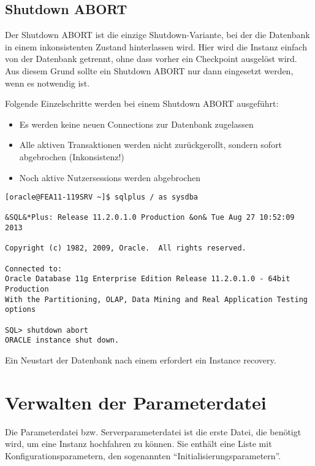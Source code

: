       \subsection{Shutdown ABORT}
        Der Shutdown ABORT ist die einzige Shutdown-Variante, bei der die
        Datenbank in einem inkonsistenten Zustand hinterlassen wird. Hier wird
        die Instanz einfach von der Datenbank getrennt, ohne dass vorher ein
        Checkpoint ausgelöst wird. Aus diesem Grund sollte ein Shutdown ABORT
        nur dann eingesetzt werden, wenn es notwendig ist.

        Folgende Einzelschritte werden bei einem Shutdown ABORT ausgeführt:
        \begin{itemize}
          \item Es werden keine neuen Connections zur Datenbank zugelassen
          \item Alle aktiven Transaktionen werden nicht zurückgerollt, sondern sofort abgebrochen (Inkonsistenz!)
          \item Noch aktive Nutzersessions werden abgebrochen
        \end{itemize}
        \begin{lstlisting}[caption={Durchführen eines Shutdown ABORT},label=admin13,language=sqlplus]
[oracle@FEA11-119SRV ~]$ sqlplus / as sysdba

&SQL&*Plus: Release 11.2.0.1.0 Production &on& Tue Aug 27 10:52:09 2013

Copyright (c) 1982, 2009, Oracle.  All rights reserved.

Connected to:
Oracle Database 11g Enterprise Edition Release 11.2.0.1.0 - 64bit Production
With the Partitioning, OLAP, Data Mining and Real Application Testing options

SQL> shutdown abort
ORACLE instance shut down.
        \end{lstlisting}
  
        \begin{merke}
          Ein Neustart der Datenbank nach einem  erfordert ein Instance recovery.
        \end{merke}
        \begin{literaturinternet}
          \item \cite{i1006091}
        \end{literaturinternet}
    \section{Verwalten der Parameterdatei}
      Die Parameterdatei bzw. Serverparameterdatei ist die erste Datei, die benötigt wird, um eine Instanz hochfahren zu können. Sie enthält eine Liste mit Konfigurationsparametern, den sogenannten \enquote{Init\-iali\-sierungs\-pa\-ra\-me\-tern}.


